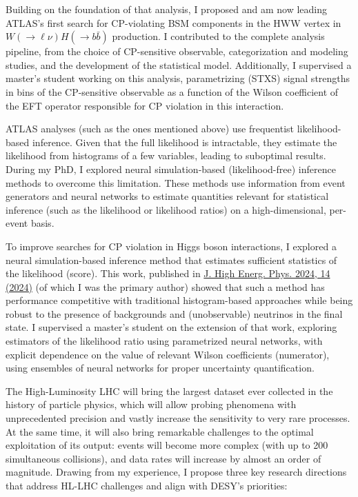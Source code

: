 \documentclass[11pt, a4paper]{awesome-cv}
\begin{document}
\begin{cvletter}
  Building on the foundation of that analysis, I proposed and am now leading ATLAS's first search for CP-violating BSM components in the HWW vertex in $W(\to \ell \nu)H(\to b\bar{b})$ production. I contributed to the complete analysis pipeline, from the choice of CP-sensitive observable, categorization and modeling studies, and the development of the statistical model. Additionally, I supervised a master's student working on this analysis, parametrizing (STXS) signal strengths in bins of the CP-sensitive observable as a function of the Wilson coefficient of the EFT operator responsible for CP violation in this interaction.
  
  
  ATLAS analyses (such as the ones mentioned above) use frequentist likelihood-based inference. Given that the full likelihood is intractable, they estimate the likelihood from histograms of a few variables, leading to suboptimal results. During my PhD, I explored neural simulation-based (likelihood-free) inference methods to overcome this limitation. These methods use information from event generators and neural networks to estimate quantities relevant for statistical inference (such as the likelihood or likelihood ratios) on a high-dimensional, per-event basis.
  
  To improve searches for CP violation in Higgs boson interactions, I explored a neural simulation-based inference method that estimates sufficient statistics of the likelihood (score). This work, published in \href{https://doi.org/10.1007/JHEP04(2024)014}{J. High Energ. Phys. 2024, 14 (2024)} (of which I was the primary author) showed that such a method has performance competitive with traditional histogram-based approaches while being robust to the presence of backgrounds and (unobservable) neutrinos in the final state. I supervised a master's student on the extension of that work, exploring estimators of the likelihood ratio using parametrized neural networks, with explicit dependence on the value of relevant Wilson coefficients (numerator), using ensembles of neural networks for proper uncertainty quantification.
  
  
  The High-Luminosity LHC will bring the largest dataset ever collected in the history of particle physics, which will allow probing phenomena with unprecedented precision and vastly increase the sensitivity to very rare processes. At the same time, it will also bring remarkable challenges to the optimal exploitation of its output: events will become more complex (with up to 200 simultaneous collisions), and data rates will increase by almost an order of magnitude. Drawing from my experience, I propose three key research directions that address HL-LHC challenges and align with DESY's priorities:
  

\end{cvletter}
\end{document}
